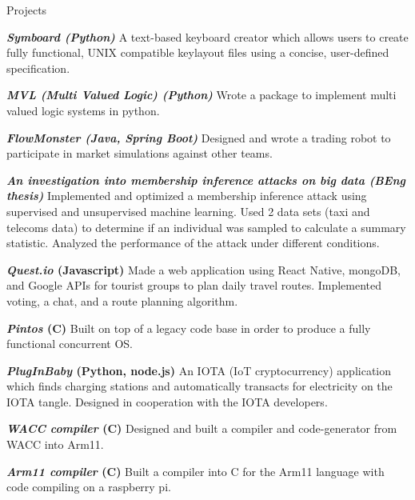 \documentclass[10pt]{resume} %
\begin{document}
\begin{rSection}{Projects}

  \item \textbf{\textit{Symboard (Python)}} A text-based keyboard creator which
    allows users to create fully functional, UNIX compatible keylayout files
    using a concise, user-defined specification.
  \item \textbf{\textit{MVL (Multi Valued Logic) (Python)}} Wrote a package to
    implement multi valued logic systems in python.
  \item \textbf{\textit{FlowMonster (Java, Spring Boot)}} Designed and wrote a
    trading robot to participate in market simulations against other teams.
  \item \textbf{\textit{An investigation into membership inference attacks on
    big data (BEng thesis)}} Implemented and optimized a membership inference
    attack using supervised and unsupervised machine learning. Used 2 data sets
    (taxi and telecoms data) to determine if an individual was sampled to
    calculate a summary statistic. Analyzed the performance of the attack
    under different conditions.
  \item \textbf{\textit{Quest.io} (Javascript)} Made a web application using
    React Native, mongoDB, and Google APIs for tourist groups to plan daily
    travel routes. Implemented voting, a chat, and a route planning algorithm.
  \item \textbf{\textit{Pintos} (C)} Built on top of a legacy code base in
    order to produce a fully functional concurrent OS.
  \item \textbf{\textit{PlugInBaby} (Python, node.js)} An IOTA (IoT
    cryptocurrency) application which finds charging stations and
    automatically transacts for electricity on the IOTA tangle. Designed in
    cooperation with the IOTA developers.
  \item \textbf{\textit{WACC compiler} (C)} Designed and built a compiler and
    code-generator from WACC into Arm11.
  \item \textbf{\textit{Arm11 compiler} (C)} Built a compiler into C for the
    Arm11 language with code compiling on a raspberry pi.

\end{rSection}
\end{document}
